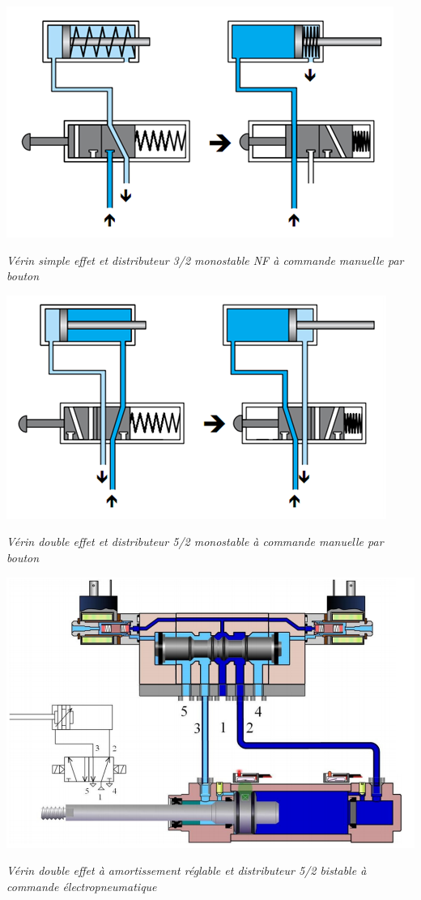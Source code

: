 \documentclass[10pt]{article}
\begin{document}
\begin{minipage}[c]{.47\textwidth}
\begin{center}
\includegraphics[width=.9\textwidth]{images/Fig_07}

\textit{Vérin simple effet et distributeur 3/2 monostable NF à commande manuelle par bouton}
\end{center}
\end{minipage} \hfill
\begin{minipage}[c]{.47\textwidth}
\begin{center}
\includegraphics[width=.9\textwidth]{images/Fig_08}

\textit{Vérin double effet et distributeur 5/2 monostable à commande manuelle par bouton}
\end{center}
\end{minipage}


\begin{center}
\includegraphics[width=.8\textwidth]{images/Fig_09}

\textit{Vérin double effet à amortissement réglable et distributeur 5/2 bistable à commande électropneumatique}
\end{center}
\end{document}
